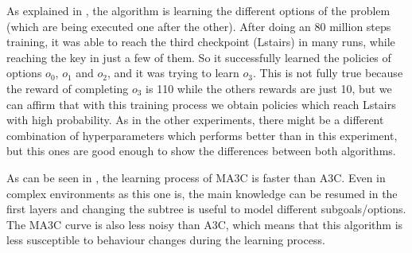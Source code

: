 As explained in , the algorithm is learning the different options of the problem (which are
being executed one after the other).
After doing an 80 million steps training, it was able to reach the third checkpoint (Lstairs) in many runs, while reaching
the key in just a few of them.
So it successfully learned the policies of options $o_0$, $o_1$ and $o_2$, and it was trying to learn $o_3$.
This is not fully true because the reward of completing $o_3$ is 110 while the others rewards are just 10, but we can
affirm that with this training process we obtain policies which reach Lstairs with high probability.
As in the other experiments, there might be a different combination of hyperparameters which performs better than in this experiment,
but this ones are good enough to show the differences between both algorithms.


As can be seen in , the learning process of \ac{MA3C} is faster than \ac{A3C}.
Even in complex environments as this one is, the main knowledge can be resumed in the first layers and changing the
subtree is useful to model different subgoals/options.
The \ac{MA3C} curve is also less noisy than \ac{A3C}, which means that this algorithm is less susceptible to
behaviour changes during the learning process.

